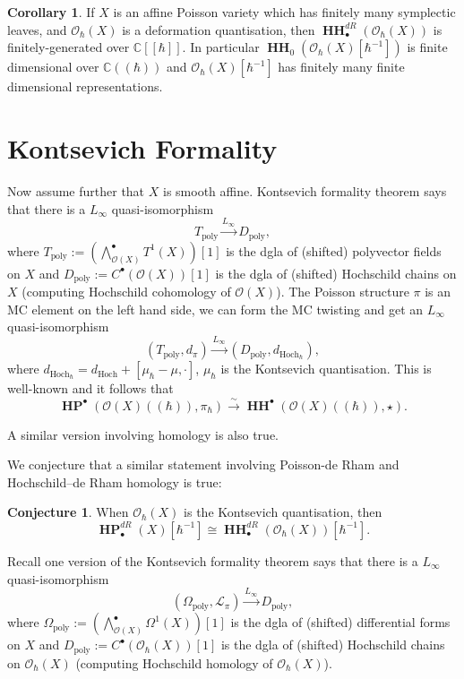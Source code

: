 \documentclass[draft]{article}
\theoremstyle{definition}
\newtheorem{corollary}[theorem]{Corollary}
\newtheorem{conjecture}[theorem]{Conjecture}
\DeclareMathOperator{\HH}{\mathbf{HH}}
\DeclareMathOperator{\HP}{\mathbf{HP}}
\newcommand{\doubleh}{[\![ \hbar ]\!]}
\newcommand{\OhX}{\mathcal{O}_\hbar(X)}
\begin{document}
\begin{corollary}
If $X$ is an affine Poisson variety which has finitely many symplectic leaves, and $\OhX$ is a deformation quantisation, then $\HH^{dR}_\bullet(\OhX)$ is finitely-generated over $\mathbb{C}\doubleh$. In particular $\HH_0(\OhX[\hbar^{-1}])$ is finite dimensional over $\mathbb{C}((\hbar))$ and $\OhX[\hbar^{-1}]$ has finitely many finite dimensional representations.
\end{corollary}





\section{Kontsevich Formality}\label{Kontsevich_Formality}
Now assume further that $X$ is smooth affine. Kontsevich formality theorem says that there is a $L_\infty$ quasi-isomorphism $$T_{\text{poly}}\xrightarrow{L_\infty}D_{\text{poly}},$$ where $T_{\text{poly}}:=(\bigwedge^\bullet_{\mathcal{O}(X)}T^1(X))[1]$ is the dgla of (shifted) polyvector fields on $X$ and $D_{\text{poly}}:=C^\bullet(\mathcal{O}(X))[1]$ is the dgla of (shifted) Hochschild chains on $X$ (computing Hochschild cohomology of $\mathcal{O}(X)$). The Poisson structure $\pi$ is an MC element on the left hand side, we can form the MC twisting and get an $L_\infty$ quasi-isomorphism $$(T_{\text{poly}},d_\pi)\xrightarrow{L_\infty}(D_{\text{poly}},d_{\text{Hoch}_\hbar}),$$ where $d_{\text{Hoch}_\hbar}=d_{\text{Hoch}}+[\mu_\hbar-\mu,\cdot]$, $\mu_\hbar$ is the Kontsevich quantisation. This is well-known and it follows that $$\HP^\bullet(\mathcal{O}(X)((\hbar)), \pi_\hbar) \xrightarrow{\sim} \HH^\bullet(\mathcal{O}(X)((\hbar)),\star).$$

A similar version involving homology is also true. 

We conjecture that a similar statement involving Poisson-de Rham and Hochschild--de Rham homology is true:

\begin{conjecture}
When $\OhX$ is the Kontsevich quantisation, then $$\HP^{dR}_\bullet(X)[\hbar^{-1}]\cong \HH^{dR}_\bullet (\OhX)[\hbar^{-1}].$$
\end{conjecture}

Recall one version of the Kontsevich formality theorem says that there is a $L_\infty$ quasi-isomorphism $$(\Omega_{\text{poly}},\mathcal{L}_\pi)\xrightarrow{L_\infty}D_{\text{poly}},$$ where $\Omega_{\text{poly}}:=(\bigwedge^\bullet_{\mathcal{O}(X)}\Omega^1(X))[1]$ is the dgla of (shifted) differential forms on $X$ and  $D_{\text{poly}}:=C^\bullet(\OhX)[1]$ is the dgla of (shifted) Hochschild chains on $\OhX$ (computing Hochschild homology of $\OhX$). 
\end{document}
